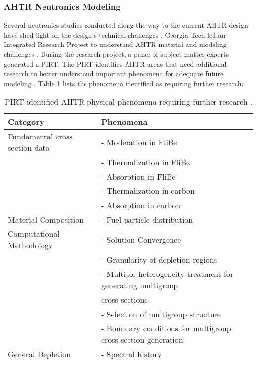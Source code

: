 \subsubsection{AHTR Neutronics Modeling}
Several neutronics studies conducted along the way to the current \gls{AHTR} 
design have shed light on the design's technical challenges 
\cite{ramey_monte_2018,holcomb_fluoride_2013,greene_pre-conceptual_2010}. 
\gls{Georgia Tech} led an Integrated Research Project to understand \gls{AHTR} 
material and modeling challenges \cite{zhang_integrated_2019}. 
During the research project, a panel of subject matter experts 
generated a \gls{PIRT}.
The \gls{PIRT} identifies \gls{AHTR} areas that need additional research to better 
understand important phenomena for adequate future modeling
\cite{rahnema_phenomena_2019}. 
Table \ref{tab:phenomena} lists the phenomena identified as requiring further 
research. 
\begin{table}[htb!]
    \centering
    \onehalfspacing
    \caption{\acrlong{PIRT} identified \acrlong{AHTR} physical phenomena requiring 
    further research \cite{rahnema_phenomena_2019}.}
	\label{tab:phenomena}
    \footnotesize
    \begin{tabular}{l|l}
    \hline
    \textbf{Category} & \textbf{Phenomena} \\ \hline
    Fundamental cross section data & - Moderation in FliBe \\
    & - Thermalization in FliBe \\
    & - Absorption in FliBe \\
    & - Thermalization in carbon \\
    & - Absorption in carbon \\ \hline
    Material Composition & - Fuel particle distribution \\ \hline
    Computational Methodology & - Solution Convergence \\ 
    & - Granularity of depletion regions \\
    & - Multiple heterogeneity treatment for generating multigroup \\ 
    & cross sections \\
    & - Selection of multigroup structure \\
    & - Boundary conditions for multigroup cross section generation \\ \hline 
    General Depletion & - Spectral history \\ \hline 
    \end{tabular}
\end{table}

